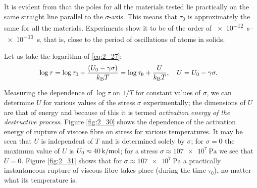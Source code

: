 It is evident from  that the poles for all the materials tested lie practically on the same straight line parallel to the $\sigma$-axis. This means that $\tau_0$ is approximately the same for all the materials. Experiments show it to be of the order of \SIrange{e-12}{e-13}{\second}, that is, close to the period of oscillations of atoms in solids.

Let us take the logarithm of \eqref{eq:2_27}:
\begin{equation}\label{eq:2_29}
	\log{\tau} = \log{\tau_0} + \frac{(U_0 - \gamma\sigma)}{k_{\text{B}}T} = \log{\tau_0} + \frac{U}{k_{\text{B}}T},\quad U = U_0 - \gamma\sigma.
\end{equation}

\noindent
Measuring the dependence of $\log{\tau}$ on $1/T$ for constant values of $\sigma$, we can determine $U$ for various values of the stress $\sigma$ experimentally; the dimensions of $U$ are that of energy and because of this it is termed \textit{activation energy of the destructive process}. Figure \ref{fig:2_30} shows the dependence of the activation energy of rupture of viscose fibre on stress for various temperatures.
It may be seen that $U$ is independent of $T$ and is determined solely by $\sigma$; for $\sigma=0$ the maximum value of $U$ is $U_0\approx\SI{40}{\kilo\cal\per\mole}$; for a stress $\sigma\approx\SI{107e7}{\pascal}$ we see that $U=0$.
Figure \ref{fig:2_31} shows that for $\sigma\approx\SI{107e7}{\pascal}$ a practically instantaneous rupture of viscous fibre takes place (during the time $\tau_0$), no matter what its temperature is.

